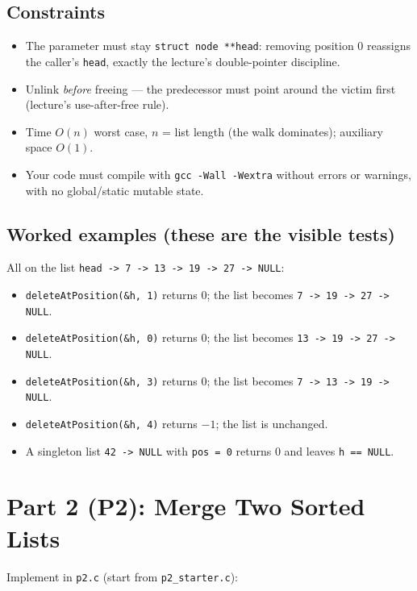 \documentclass[11pt]{article}
\begin{document}
\subsection{Constraints}

\begin{itemize}
  \item The parameter must stay \texttt{struct node **head}: removing position $0$ reassigns the caller's \texttt{head}, exactly the lecture's double-pointer discipline.
  \item Unlink \emph{before} freeing --- the predecessor must point around the victim first (lecture's use-after-free rule).
  \item Time $O(n)$ worst case, $n$ = list length (the walk dominates); auxiliary space $O(1)$.
  \item Your code must compile with \texttt{gcc -Wall -Wextra} without errors or warnings, with no global/static mutable state.
\end{itemize}

\subsection{Worked examples (these are the visible tests)}

All on the list \texttt{head -> 7 -> 13 -> 19 -> 27 -> NULL}:

\begin{itemize}
  \item \texttt{deleteAtPosition(\&h, 1)} returns $0$; the list becomes \texttt{7 -> 19 -> 27 -> NULL}.
  \item \texttt{deleteAtPosition(\&h, 0)} returns $0$; the list becomes \texttt{13 -> 19 -> 27 -> NULL}.
  \item \texttt{deleteAtPosition(\&h, 3)} returns $0$; the list becomes \texttt{7 -> 13 -> 19 -> NULL}.
  \item \texttt{deleteAtPosition(\&h, 4)} returns $-1$; the list is unchanged.
  \item A singleton list \texttt{42 -> NULL} with \texttt{pos = 0} returns $0$ and leaves \texttt{h == NULL}.
\end{itemize}

\section{Part 2 (P2): Merge Two Sorted Lists}

Implement in \texttt{p2.c} (start from \texttt{p2\_starter.c}):
\end{document}
